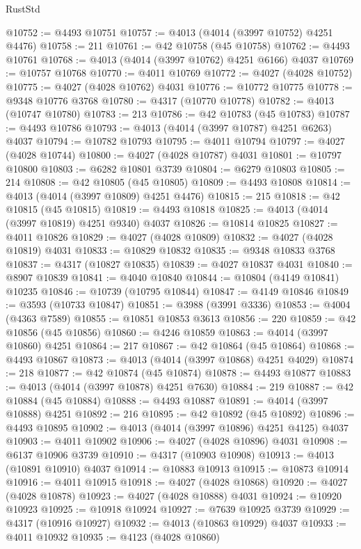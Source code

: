 \begin{lexlean}{RustStd}
\begin{coremodule}
@10752 := @4493 @10751
@10757 := @4013 (@4014 (@3997 @10752) @4251 @4476)
@10758 := 211
@10761 := @42 @10758 (@45 @10758)
@10762 := @4493 @10761
@10768 := @4013 (@4014 (@3997 @10762) @4251 @6166) @4037
@10769 := @10757 @10768
@10770 := @4011 @10769
@10772 := @4027 (@4028 @10752)
@10775 := @4027 (@4028 @10762) @4031
@10776 := @10772 @10775
@10778 := @9348 @10776 @3768
@10780 := @4317 (@10770 @10778)
@10782 := @4013 (@10747 @10780)
@10783 := 213
@10786 := @42 @10783 (@45 @10783)
@10787 := @4493 @10786
@10793 := @4013 (@4014 (@3997 @10787) @4251 @6263) @4037
@10794 := @10782 @10793
@10795 := @4011 @10794
@10797 := @4027 (@4028 @10744)
@10800 := @4027 (@4028 @10787) @4031
@10801 := @10797 @10800
@10803 := @6282 @10801 @3739
@10804 := @6279 @10803
@10805 := 214
@10808 := @42 @10805 (@45 @10805)
@10809 := @4493 @10808
@10814 := @4013 (@4014 (@3997 @10809) @4251 @4476)
@10815 := 215
@10818 := @42 @10815 (@45 @10815)
@10819 := @4493 @10818
@10825 := @4013 (@4014 (@3997 @10819) @4251 @9340) @4037
@10826 := @10814 @10825
@10827 := @4011 @10826
@10829 := @4027 (@4028 @10809)
@10832 := @4027 (@4028 @10819) @4031
@10833 := @10829 @10832
@10835 := @9348 @10833 @3768
@10837 := @4317 (@10827 @10835)
@10839 := @4027 @10837 @4031
@10840 := @8907 @10839
@10841 := @4040 @10840
@10844 := @10804 (@4149 @10841) @10235
@10846 := @10739 (@10795 @10844)
@10847 := @4149 @10846
@10849 := @3593 (@10733 @10847)
@10851 := @3988 (@3991 @3336)
@10853 := @4004 (@4363 @7589)
@10855 := @10851 @10853 @3613
@10856 := 220
@10859 := @42 @10856 (@45 @10856)
@10860 := @4246 @10859
@10863 := @4014 (@3997 @10860) @4251
@10864 := 217
@10867 := @42 @10864 (@45 @10864)
@10868 := @4493 @10867
@10873 := @4013 (@4014 (@3997 @10868) @4251 @4029)
@10874 := 218
@10877 := @42 @10874 (@45 @10874)
@10878 := @4493 @10877
@10883 := @4013 (@4014 (@3997 @10878) @4251 @7630)
@10884 := 219
@10887 := @42 @10884 (@45 @10884)
@10888 := @4493 @10887
@10891 := @4014 (@3997 @10888) @4251
@10892 := 216
@10895 := @42 @10892 (@45 @10892)
@10896 := @4493 @10895
@10902 := @4013 (@4014 (@3997 @10896) @4251 @4125) @4037
@10903 := @4011 @10902
@10906 := @4027 (@4028 @10896) @4031
@10908 := @6137 @10906 @3739
@10910 := @4317 (@10903 @10908)
@10913 := @4013 (@10891 @10910) @4037
@10914 := @10883 @10913
@10915 := @10873 @10914
@10916 := @4011 @10915
@10918 := @4027 (@4028 @10868)
@10920 := @4027 (@4028 @10878)
@10923 := @4027 (@4028 @10888) @4031
@10924 := @10920 @10923
@10925 := @10918 @10924
@10927 := @7639 @10925 @3739
@10929 := @4317 (@10916 @10927)
@10932 := @4013 (@10863 @10929) @4037
@10933 := @4011 @10932
@10935 := @4123 (@4028 @10860)

\end{coremodule}
\end{lexlean}
